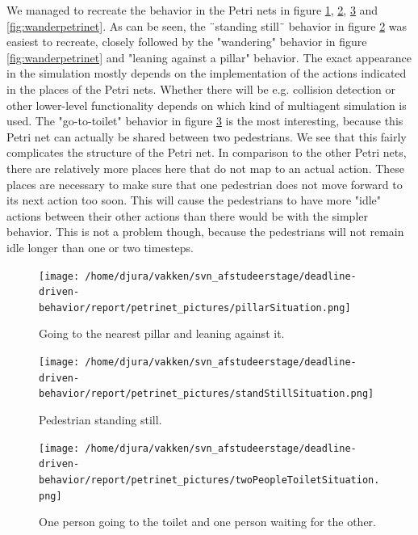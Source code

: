 \documentclass[11pt]{book}
\begin{document}
We managed to recreate the behavior in the Petri nets in figure \ref{fig:pillarpetrinet}, \ref{fig:standstillpetrinet}, \ref{fig:gototoiletpetrinet} and \ref{fig:wanderpetrinet}. As can be seen, the ¨standing still¨ behavior in figure \ref{fig:standstillpetrinet} was easiest to recreate, closely followed by the "wandering" behavior in figure \ref{fig:wanderpetrinet} and "leaning against a pillar" behavior. The exact appearance in the simulation mostly depends on the implementation of the actions indicated in the places of the Petri nets. Whether there will be e.g. collision detection or other lower-level functionality depends on which kind of multiagent simulation is used. The "go-to-toilet" behavior in figure \ref{fig:gototoiletpetrinet} is the most interesting, because this Petri net can actually be shared between two pedestrians. We see that this fairly complicates the structure of the Petri net. In comparison to the other Petri nets, there are relatively more places here that do not map to an actual action. These places are necessary to make sure that one pedestrian does not move forward to its next action too soon. This will cause the pedestrians to have more "idle" actions between their other actions than there would be with the simpler behavior. This is not a problem though, because the pedestrians will not remain idle longer than one or two timesteps.


\begin{figure}[[h!]
\centering            
\texttt{[image: /home/djura/vakken/svn\_afstudeerstage/deadline-driven-behavior/report/petrinet\_pictures/pillarSituation.png]}
\caption{Going to the nearest pillar and leaning against it.}
\label{fig:pillarpetrinet}
\end{figure}

\begin{figure}[h!]
\centering            
\texttt{[image: /home/djura/vakken/svn\_afstudeerstage/deadline-driven-behavior/report/petrinet\_pictures/standStillSituation.png]}
\caption{Pedestrian standing still.}
\label{fig:standstillpetrinet}
\end{figure}

\begin{figure}[h!]
\centering            
\texttt{[image: /home/djura/vakken/svn\_afstudeerstage/deadline-driven-behavior/report/petrinet\_pictures/twoPeopleToiletSituation.png]}
\caption{One person going to the toilet and one person waiting for the other.}
\label{fig:gototoiletpetrinet}
\end{figure}
\end{document}
